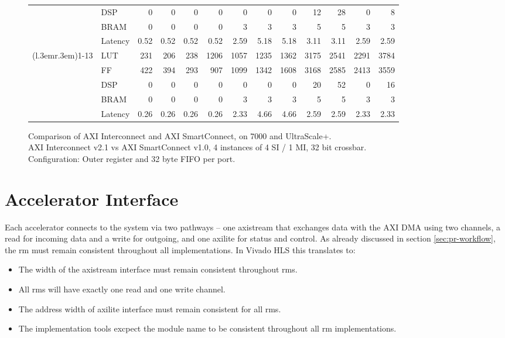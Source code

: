 \begin{figure}[ht!]
{\begin{tabular}{cl rrrr rrrrrrr}
&DSP	& 0   & 0   & 0   & 0   & 0   & 0   & 0   &12   &28  & 0  & 8    \\
&BRAM	& 0   & 0   & 0   & 0   & 3   & 3   & 3   &5    & 5  & 3  & 3    \\
&Latency& 0.52& 0.52& 0.52& 0.52& 2.59& 5.18& 5.18&3.11 &3.11&2.59&2.59  \\
\cmidrule(l{.3em}r{.3em}){1-13}
\multirow{5}{*}{\rotatebox{90}{64 bit}} &
LUT	& 231 & 206 & 238 &1206 & 1057&1235 &1362 &3175 &2541&2291& 3784 \\
&FF	& 422 & 394 & 293 & 907 & 1099&1342 &1608 &3168 &2585&2413& 3559 \\
&DSP	& 0   & 0   & 0   & 0   & 0   & 0   & 0   & 20  &52  &0   & 16   \\
&BRAM	& 0   & 0   & 0   & 0   & 3   & 3   & 3   & 5   & 5  &3   & 3    \\
&Latency& 0.26& 0.26& 0.26& 0.26& 2.33& 4.66& 4.66& 2.59&2.59&2.33& 2.33 \\
\bottomrule
\end{tabular}
}
\caption{Comparison of AXI Interconnect and AXI SmartConnect, on 7000 and UltraScale+.\\
	AXI Interconnect v2.1 vs AXI SmartConnect v1.0, 4 instances of 4 SI / 1 MI, 32 bit crossbar.\\ 
	Configuration: Outer register and 32 byte FIFO per port.}
\label{tab:acc-util}
\end{figure}


\section{Accelerator Interface}

Each accelerator connects to the system via two pathways -- one \gls{axistream} that 
exchanges data with the AXI DMA using two channels, a read for incoming data and
a write for outgoing, and one \gls{axilite} for status and control.
As already discussed in section \ref{sec:pr-workflow}, the \gls{rm} must remain
consistent throughout all implementations. In Vivado HLS this translates to:

\begin{itemize}
\item	The width of the \gls{axistream} interface must remain consistent throughout \glspl{rm}.
\item	All \glspl{rm} will have exactly one read and one write channel. 
\item	The address width of \gls{axilite} interface must remain consistent for all \glspl{rm}.
\item	The implementation tools excpect the module name to be consistent throughout
	all \gls{rm} implementations.
\end{itemize}

